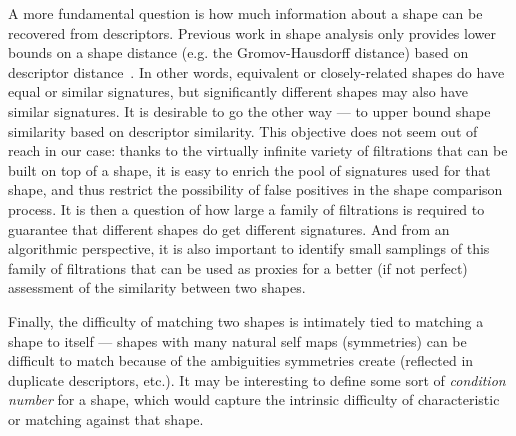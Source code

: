 A more fundamental question is how much information about a shape can
be recovered from descriptors. Previous work in shape analysis only
provides lower bounds on a shape distance (e.g. the Gromov-Hausdorff
distance) based on descriptor distance~\cite{survey on
  signatures?}. In other words, equivalent or closely-related shapes
do have equal or similar signatures, but significantly different
shapes may also have similar signatures. It is desirable to go the
other way --- to upper bound shape similarity based on descriptor
similarity. This objective does not seem out of reach in our case:
thanks to the virtually infinite variety of filtrations that can be
built on top of a shape, it is easy to enrich the pool of signatures
used for that shape, and thus restrict the possibility of false
positives in the shape comparison process. It is then a question of
how large a family of filtrations is required to guarantee that
different shapes do get different signatures. And from an algorithmic
perspective, it is also important to identify small samplings of this
family of filtrations that can be used as proxies for a better (if not
perfect) assessment of the similarity between two shapes.

Finally, the difficulty of matching two shapes is
intimately tied to matching a shape to itself --- shapes with many
natural self maps (symmetries) can be difficult to match because of
the ambiguities symmetries create (reflected in duplicate descriptors,
etc.). It may be interesting to define some sort of {\em condition
  number} for a shape, which would capture the intrinsic difficulty of
characteristic or matching against that shape.



